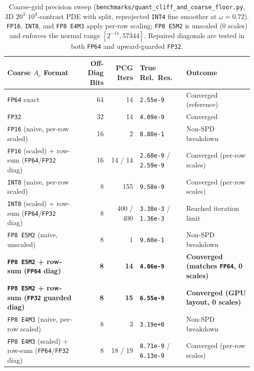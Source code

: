 \documentclass[10pt]{article}
\begin{document}
\begin{table}[t]
\centering\small
\begin{tabular}{@{}lrrll@{}}
\toprule
Coarse $A_c$ Format & Off-Diag Bits & PCG Iters & True Rel.\ Res. & Outcome \\
\midrule
\texttt{FP64} exact & 64 & 14 & \texttt{2.55e-9} & Converged (reference) \\
\texttt{FP32} & 32 & 14 & \texttt{4.09e-9} & Converged \\
\texttt{FP16} (naive, per-row scaled) & 16 & 2 & \texttt{8.88e-1} & Non-SPD breakdown \\
\texttt{FP16} (scaled) + row-sum (\texttt{FP64}/\texttt{FP32} diag) & 16 & 14 / 14 & \texttt{2.60e-9} / \texttt{2.59e-9} & Converged (per-row scales) \\
\texttt{INT8} (naive, per-row scaled) & 8 & 155 & \texttt{9.58e-9} & Converged (per-row scales) \\
\texttt{INT8} (scaled) + row-sum (\texttt{FP64}/\texttt{FP32} diag) & 8 & 400 / 400 & \texttt{3.38e-3} / \texttt{1.36e-3} & Reached iteration limit \\
\texttt{FP8 E5M2} (naive, unscaled) & 8 & 1 & \texttt{9.60e-1} & Non-SPD breakdown \\
\textbf{\texttt{FP8 E5M2} + row-sum (\texttt{FP64} diag)} & \textbf{8} & \textbf{14} & \textbf{\texttt{4.06e-9}} & \textbf{Converged (matches \texttt{FP64}, 0 scales)} \\
\textbf{\texttt{FP8 E5M2} + row-sum (\texttt{FP32} guarded diag)} & \textbf{8} & \textbf{15} & \textbf{\texttt{6.55e-9}} & \textbf{Converged (GPU layout, 0 scales)} \\
\texttt{FP8 E4M3} (naive, per-row scaled) & 8 & 3 & \texttt{3.19e+0} & Non-SPD breakdown \\
\texttt{FP8 E4M3} (scaled) + row-sum (\texttt{FP64}/\texttt{FP32} diag) & 8 & 18 / 19 & \texttt{8.71e-9} / \texttt{6.13e-9} & Converged (per-row scales) \\
\bottomrule
\end{tabular}
\caption{Coarse-grid precision sweep (\texttt{benchmarks/quant\_cliff\_and\_coarse\_floor.py}, 3D $20^3$ $10^4$-contrast PDE with split, reprojected \texttt{INT4} fine smoother at $\omega = 0.72$). \texttt{FP16}, \texttt{INT8}, and \texttt{FP8 E4M3} apply per-row scaling; \texttt{FP8 E5M2} is unscaled (0 scales) and enforces the normal range $[2^{-14}, 57344]$. Repaired diagonals are tested in both \texttt{FP64} and upward-guarded \texttt{FP32}.}
\label{tab:coarse}
\end{table}
\end{document}
